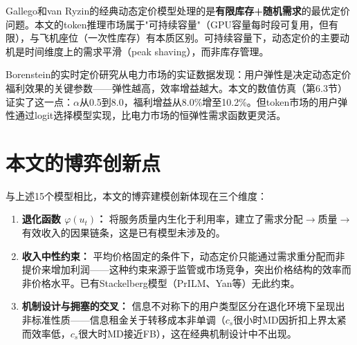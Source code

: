 \documentclass[11pt]{article}
\begin{document}
Gallego和van Ryzin\cite{gallego1994multiproduct}的经典动态定价模型处理的是\textbf{有限库存+随机需求}的最优定价问题。本文的token推理市场属于"可持续容量"（GPU容量每时段可复用，但有限），与飞机座位（一次性库存）有本质区别。可持续容量下，动态定价的主要动机是时间维度上的需求平滑（peak shaving），而非库存管理。

Borenstein\cite{borenstein2005long}的实时定价研究从电力市场的实证数据发现：用户弹性是决定动态定价福利效果的关键参数——弹性越高，效率增益越大。本文的数值仿真（第6.3节）证实了这一点：$\alpha$从0.5到8.0，福利增益从8.0\%增至10.2\%。但token市场的用户弹性通过logit选择模型实现，比电力市场的恒弹性需求函数更灵活。

\section{本文的博弈创新点}

与上述15个模型相比，本文的博弈建模创新体现在三个维度：

\begin{enumerate}
  \item \textbf{退化函数 $\varphi(u_t)$：} 将服务质量内生化于利用率，建立了需求分配$\rightarrow$质量$\rightarrow$有效收入的因果链条，这是已有模型未涉及的。
  \item \textbf{收入中性约束：} 平均价格固定的条件下，动态定价只能通过需求重分配而非提价来增加利润——这种约束来源于监管或市场竞争，突出价格结构的效率而非价格水平。已有Stackelberg模型（PrILM、Yan等）无此约束。
  \item \textbf{机制设计与拥塞的交叉：} 信息不对称下的用户类型区分在退化环境下呈现出非标准性质——信息租金关于转移成本非单调（$c_s$很小时MD因折扣上界太紧而效率低，$c_s$很大时MD接近FB），这在经典机制设计中不出现。
\end{enumerate}
\end{document}

